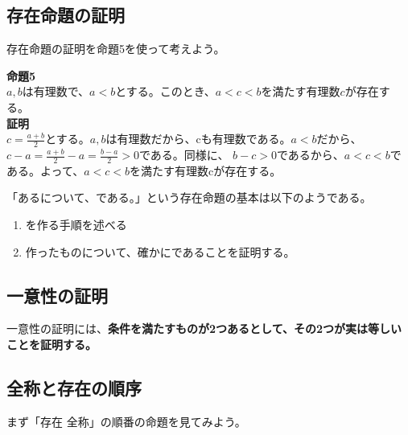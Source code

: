 \documentclass{jlreq}
\begin{document}
\subsection{存在命題の証明}
存在命題の証明を命題5を使って考えよう。

\begin{tcolorbox}[enhanced,title=命題5と証明, 
  attach boxed title to top left, 
  colback=white!95!blue,
  colbacktitle=white!10!blue!50!black,
  drop fuzzy shadow,
  boxrule=0.25mm,
  ]
  \textbf{命題5} \\
  $a, b$は有理数で、$a < b$とする。このとき、$a < c < b$を満たす有理数$c$が存在する。\\
  \textbf{証明} \\
  $c = \frac{a + b}{2}$とする。$a, b$は有理数だから、cも有理数である。$a < b$だから、$ c - a = \frac{a + b}{2} - a = \frac{b - a}{2} > 0$である。同様に、
  $b - c > 0$であるから、$a < c < b$である。よって、$a < c < b$を満たす有理数cが存在する。
\end{tcolorbox}

「ある\triangle \triangle について、\star \star である。」という存在命題の基本は以下のようである。

\begin{enumerate}
  \item \triangle \triangle を作る手順を述べる
  \item 作ったものについて、確かに\star \star であることを証明する。
\end{enumerate}

\subsection{一意性の証明}
一意性の証明には、\textbf{条件を満たすものが2つあるとして、その2つが実は等しいことを証明する。}

\subsection{全称と存在の順序}

まず「存在 \rightarrow 全称」の順番の命題を見てみよう。
\end{document}
